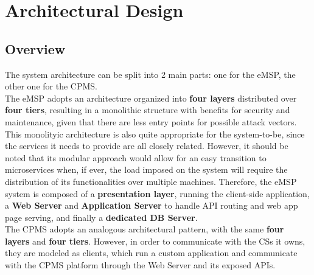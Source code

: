 \documentclass[11pt]{article}
\begin{document}
\newpage

\section{Architectural Design}







\subsection{Overview}

The system architecture can be split into 2 main parts: one for the eMSP, the other one for the CPMS. \\
The eMSP adopts an architecture organized into \textbf{four layers} distributed over \textbf{four tiers}, resulting in a monolithic structure with benefits for security and maintenance, given that there are less entry points for possible attack vectors. This monolityic architecture is also quite appropriate for the system-to-be, since the services it needs to provide are all closely related. However, it should be noted that its modular approach would allow for an easy transition to microservices when, if ever, the load imposed on the system will require the distribution of its functionalities over multiple machines. Therefore, the eMSP system is composed of a \textbf{presentation layer}, running the client-side application, a \textbf{Web Server} and \textbf{Application Server} to handle API routing and web app page serving, and finally a \textbf{dedicated DB Server}. \\
The CPMS adopts an analogous architectural pattern, with the same \textbf{four layers} and \textbf{four tiers}. However, in order to communicate with the CSs it owns, they are modeled as clients, which run a custom application and communicate with the CPMS platform through the Web Server and its exposed APIs. \\
\end{document}
